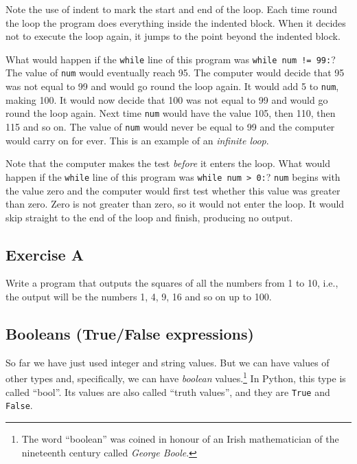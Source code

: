 Note the use of %
indent to mark the start and end of the loop.
Each time round the loop the program does everything inside
the indented block.
When it decides not to execute the loop again, it jumps to the point
beyond the indented block.

What would happen if the \texttt{while} line of this program was
\texttt{while num != 99:}?
The value of \texttt{num} would eventually reach 95.  The computer would
decide that 95 was not equal to 99 and would go round the loop again.
It would add 5 to \texttt{num}, making 100.
It would now decide that 100 was not equal to 99 and would go round the
loop again.  Next time \texttt{num} would have the value 105, then 110,
then 115 and so on.  The value of \texttt{num} would never be equal to 99
and the computer would carry on for ever.  This is an example of
an \emph{infinite loop}.

Note that the computer makes the test \emph{before} it enters the loop.
What would happen if the \texttt{while} line of this program was
\texttt{while num > 0:}?
\texttt{num} begins with the value zero and the computer would first
test whether this value was greater than zero.  Zero is not greater than
zero, so it would not enter the loop.  It would skip straight to the end
of the loop and finish, producing no output.


\subsection*{Exercise A}

Write a program that outputs the squares of all the numbers from 1 to
10, i.e., the output will be the numbers 1, 4, 9, 16 and so on up to 100.

\subsection{Booleans (True/False expressions)}

So far we have just used integer and string values.  But we can
have values of other types and, specifically, we can have
\emph{boolean} values.\footnote{The word ``boolean'' was coined in honour of an
Irish mathematician of the nineteenth century called \emph{George Boole}.}
In Python, this type is called ``bool''. Its values are also called
``truth values'', and they are
\texttt{True} and \texttt{False}.

